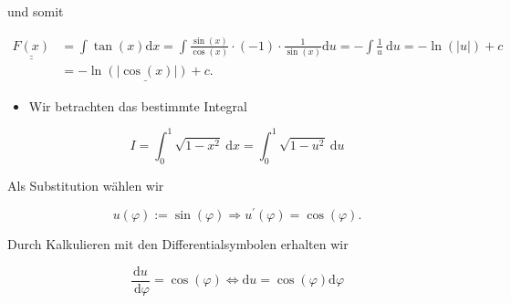 \documentclass[10pt]{article}
\begin{document}
und somit


\begin{align*}
\underline{\underline{F(x)}} & =\int \tan (x) \mathrm{d} x=\int \frac{\sin (x)}{\cos (x)} \cdot(-1) \cdot \frac{1}{\sin (x)} \mathrm{d} u=-\int \frac{1}{u} \mathrm{~d} u=-\ln (|u|)+c \\
& =\underline{-\ln (|\cos (x)|)+c .} \tag{3.10}
\end{align*}


\begin{itemize}
  \item Wir betrachten das bestimmte Integral
\end{itemize}


\begin{equation*}
I=\int_{0}^{1} \sqrt{1-x^{2}} \mathrm{~d} x=\int_{0}^{1} \sqrt{1-u^{2}} \mathrm{~d} u \tag{3.11}
\end{equation*}


Als Substitution wählen wir


\begin{equation*}
u(\varphi):=\sin (\varphi) \Rightarrow u^{\prime}(\varphi)=\cos (\varphi) . \tag{3.12}
\end{equation*}


Durch Kalkulieren mit den Differentialsymbolen erhalten wir


\begin{equation*}
\frac{\mathrm{d} u}{\mathrm{~d} \varphi}=\cos (\varphi) \Leftrightarrow \mathrm{d} u=\cos (\varphi) \mathrm{d} \varphi \tag{3.13}
\end{equation*}
\end{document}
